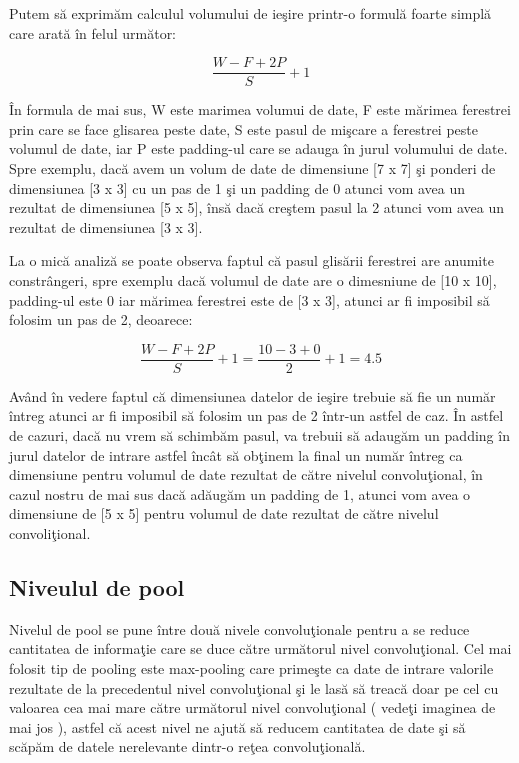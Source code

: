 Putem s\u{a} exprim\u{a}m calculul volumului de ie\c{s}ire printr-o formul\u{a} foarte simpl\u{a} care arat\u{a} \^{i}n felul urm\u{a}tor:

$$ \frac{W - F + 2P }{S} + 1 $$

\^{I}n formula de mai sus, W este marimea volumui de date, F este m\u{a}rimea ferestrei prin care se face glisarea peste date, S este pasul de mi\c{s}care a ferestrei peste volumul de date, iar P este padding-ul care se adauga \^{i}n jurul volumului de date. Spre exemplu, dac\u{a} avem un volum de date de dimensiune [7 x 7] \c{s}i ponderi de dimensiunea [3 x 3] cu un pas de 1 \c{s}i un padding de 0 atunci vom avea un rezultat de dimensiunea [5 x 5], \^{i}ns\u{a} dac\u{a} cre\c{s}tem pasul la 2 atunci vom avea un rezultat de dimensiunea [3 x 3].

\par

La o mic\u{a} analiz\u{a} se poate observa faptul c\u{a} pasul glis\u{a}rii ferestrei are anumite constr\^{a}ngeri, spre exemplu dac\u{a} volumul de date are o dimesniune de [10 x 10], padding-ul este 0 iar m\u{a}rimea ferestrei este de [3 x 3], atunci ar fi imposibil s\u{a} folosim un pas de 2, deoarece:

$$ \frac{W - F + 2P }{S} + 1 = \frac{10 - 3 + 0 }{2} + 1 = 4.5 $$

Av\^{a}nd \^{i}n vedere faptul c\u{a} dimensiunea datelor de ie\c{s}ire trebuie s\u{a} fie un num\u{a}r \^{i}ntreg atunci ar fi imposibil s\u{a} folosim un pas de 2 \^{i}ntr-un astfel de caz. \^{I}n astfel de cazuri, dac\u{a} nu vrem s\u{a} schimb\u{a}m pasul, va trebuii s\u{a} adaug\u{a}m un padding \^{i}n jurul datelor de intrare astfel \^{i}nc\^{a}t s\u{a} ob\c{t}inem la final un num\u{a}r \^{i}ntreg ca dimensiune pentru volumul de date rezultat de c\u{a}tre nivelul convolu\c{t}ional, \^{i}n cazul nostru de mai sus dac\u{a} ad\u{a}ug\u{a}m un padding de 1, atunci vom avea  o dimensiune de [5 x 5] pentru volumul de date rezultat de c\u{a}tre nivelul convoli\c{t}ional.

\subsection{Niveulul de pool}

Nivelul de pool se pune \^{i}ntre dou\u{a} nivele convolu\c{t}ionale pentru a se reduce cantitatea de informa\c{t}ie care se duce c\u{a}tre urm\u{a}torul nivel convolu\c{t}ional. Cel mai folosit tip de pooling este max-pooling care prime\c{s}te ca date de intrare valorile rezultate de la precedentul nivel convolu\c{t}ional \c{s}i le las\u{a} s\u{a} treac\u{a} doar pe cel cu valoarea cea mai mare c\u{a}tre urm\u{a}torul nivel convolu\c{t}ional ( vede\c{t}i imaginea de mai jos ), astfel c\u{a} acest nivel ne ajut\u{a} s\u{a} reducem cantitatea de date \c{s}i s\u{a} sc\u{a}p\u{a}m de datele nerelevante dintr-o re\c{t}ea convolu\c{t}ional\u{a}. 

